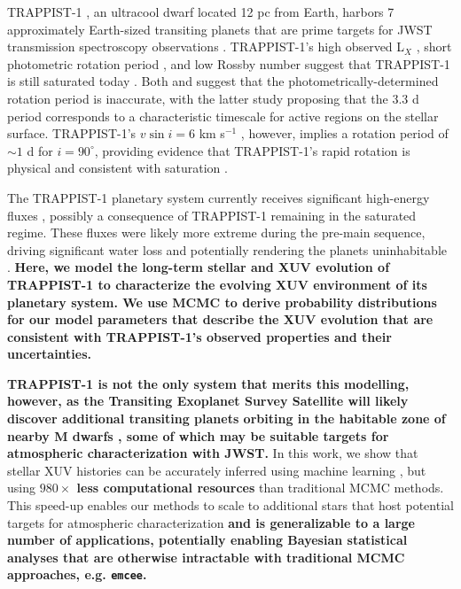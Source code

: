 \documentclass[twocolumn]{aastex62}
\def\lsim{~\rlap{$<$}{\lower 1.0ex\hbox{$\sim$}}}
\newcommand{\xxx}[1]{{\textbf{#1}}}
\newcommand{\emcee}[0]{\texttt{emcee}\xspace}
\newcommand{\approxposterior}[0]{\texttt{approxposterior}\xspace}
\begin{document}
TRAPPIST-1 \citep{Gillon2016,Gillon2017}, an ultracool dwarf located 12 pc from Earth, harbors 7 approximately Earth-sized transiting planets that are prime targets for JWST transmission spectroscopy observations \citep{Morley2017,Lincowski2018,Lustig2019}. TRAPPIST-1's high observed L$_{X}$ \citep{Wheatley2017}, short photometric rotation period \citep[3.3 d, ][]{Luger2017}, and low Rossby number \citep[Ro $\approx 0.01$, ][]{Roettenbacher2017} suggest that TRAPPIST-1 is still saturated today \citep{Pizzolato2003,Wright2011,Wright2018}. Both \citet{Roettenbacher2017} and \citet{Morris2018} suggest that the photometrically-determined rotation period is inaccurate, with the latter study proposing that the 3.3 d period corresponds to a characteristic timescale for active regions on the stellar surface. TRAPPIST-1's $v \sin i = 6$ km s$^{-1}$ \citep{Barnes2014}, however, implies a rotation period of ${\sim}1$ d for $i = 90^{\circ}$, providing evidence that TRAPPIST-1's rapid rotation is physical and consistent with saturation \citep[$P_{rot} \lsim 20$ d,][]{Wright2018}. 

The TRAPPIST-1 planetary system currently receives significant high-energy fluxes \citep{Bourrier2017b,Wheatley2017,Peacock2019}, possibly a consequence of TRAPPIST-1 remaining in the saturated regime. These fluxes were likely more extreme during the pre-main sequence, driving significant water loss and potentially rendering the planets uninhabitable \citep{Bolmont2017,Bourrier2017a}. \xxx{Here, we model the long-term stellar and XUV evolution of TRAPPIST-1 to characterize the evolving XUV environment of its planetary system. We use MCMC to derive probability distributions for our model parameters that describe the XUV evolution that are consistent with TRAPPIST-1's observed properties and their uncertainties. }

\xxx{TRAPPIST-1 is not the only system that merits this modelling, however, as the Transiting Exoplanet Survey Satellite will likely discover additional transiting planets orbiting in the habitable zone of nearby M dwarfs \citep{Barclay2018}, some of which may be suitable targets for atmospheric characterization with JWST.} In this work, we show that stellar XUV histories can be accurately inferred using machine learning \citep[\approxposterior, ][]{FlemingVanderPlas2018}, but using \xxx{$980\times$ less computational resources} than traditional MCMC methods. This speed-up enables our methods to scale to additional stars that host potential targets for atmospheric characterization \xxx{and is generalizable to a large number of applications, potentially enabling Bayesian statistical analyses that are otherwise intractable with traditional MCMC approaches, e.g. \emcee \citep{ForemanMackey2013}.}
\end{document}
